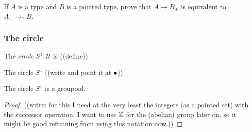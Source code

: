\begin{definition}
\begin{xca}
  If $A$ is a type and $B$ is a pointed type, prove that $A\to B_\div$ is equivalent to $A_+\to_*B$.
\end{xca}

\subsubsection{The circle}
\begin{definition}
  The \emph{circle} $S^1\colon\mathcal U$ is ((define))
\end{definition}
\label{sec:sec:circle}
\begin{definition}
  \label{def:circle}
The circle $S^1$ ((write and point it at $\bullet$))
\end{definition}

\begin{lemma}\label{lem:S1groupoid}
  The circle $S^1$ is a groupoid.
\end{lemma}
\begin{proof}
  ((write: for this I need at the very least the integers (as a pointed set) with the successor operation.  I want to use $\mathbb{Z}$ for the (abelian) group later on, so it might be good refraining from using this notation now.))
\end{proof}
\begin{definition}
  \label{def:image}
\end{definition}



\end{definition}
